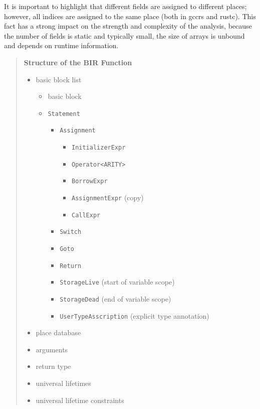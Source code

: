 \documentclass[
  11pt,
  twoside]{report}
\providecommand{\tightlist}{%
  \setlength{\itemsep}{0pt}\setlength{\parskip}{0pt}}
\begin{document}
It is important to highlight that different fields are assigned to
different places; however, all indices are assigned to the same place
(both in gccrs and rustc). This fact has a strong impact on the strength
and complexity of the analysis, because the number of fields is static
and typically small, the size of arrays is unbound and depends on
runtime information.

\begin{quote}
\textbf{Structure of the BIR Function}

\begin{itemize}
\tightlist
\item
  basic block list

  \begin{itemize}
  \tightlist
  \item
    basic block
  \item
    \texttt{Statement}

    \begin{itemize}
    \tightlist
    \item
      \texttt{Assignment}

      \begin{itemize}
      \tightlist
      \item
        \texttt{InitializerExpr}
      \item
        \texttt{Operator\textless{}ARITY\textgreater{}}
      \item
        \texttt{BorrowExpr}
      \item
        \texttt{AssignmentExpr} (copy)
      \item
        \texttt{CallExpr}
      \end{itemize}
    \item
      \texttt{Switch}
    \item
      \texttt{Goto}
    \item
      \texttt{Return}
    \item
      \texttt{StorageLive} (start of variable scope)
    \item
      \texttt{StorageDead} (end of variable scope)
    \item
      \texttt{UserTypeAsscription} (explicit type annotation)
    \end{itemize}
  \end{itemize}
\item
  place database
\item
  arguments
\item
  return type
\item
  universal lifetimes
\item
  universal lifetime constraints
\end{itemize}
\end{quote}
\end{document}
